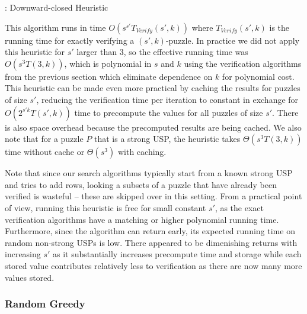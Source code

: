 \documentclass[11pt]{article}
\newcommand\sse{\subseteq}
\begin{document}
\begin{algorithm}
  \caption{: Downward-closed Heuristic}
  \label{alg:downward-closed}
\begin{algorithmic}[1]
  \For{$P' \sse P, |P'| = s'$}
        \EndIf
  \EndFor{}
\end{algorithmic}
\end{algorithm}

This algorithm runs in time $O(s^{s'} T_{Verify}(s', k))$ where
$T_{Verify}(s',k)$ is the running time for exactly verifying a
$(s',k)$-puzzle.  In practice we did not apply this heuristic for $s'$
larger than $3$, so the effective running time was $O(s^3 T(3,k))$,
which is polynomial in $s$ and $k$ using the verification algorithms
from the previous section which eliminate dependence on $k$ for
polynomial cost.  This heuristic can be made even more practical by
caching the results for puzzles of size $s'$, reducing the
verification time per iteration to constant in exchange for
$O(2^{s'k}T(s',k))$ time to precompute the values for all puzzles of
size $s'$.  There is also space overhead because the precomputed
results are being cached.  We also note that for a puzzle $P$ that is
a strong USP, the heuristic takes $\Theta(s^3 T(3,k))$ time without
cache or $\Theta(s^3)$ with caching.

Note that since our search algorithms typically start from a known
strong USP and tries to add rows, looking a subsets of a puzzle that
have already been verified is wasteful -- these are skipped over in
this setting.  From a practical point of view, running this heuristic
is free for small constant $s'$, as the exact verification algorithms
have a matching or higher polynomial running time.  Furthermore, since
the algorithm can return early, its expected running time on random
non-strong USPs is low.  There appeared to be dimenishing returns with
increasing $s'$ as it substantially increases precompute time and
storage while each stored value contributes relatively less to
verification as there are now many more values stored.

\subsubsection{Random Greedy}
\end{document}
